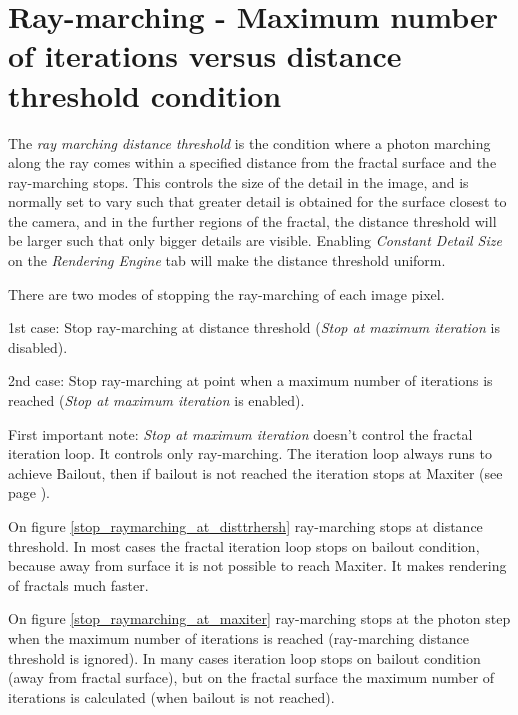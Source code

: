 \section{Ray-marching - Maximum number of iterations versus distance threshold
	condition}\label{ray-marching---maximum-number-of-iterations-versus-distance-threshold-condition}

The \emph{ray marching distance threshold} is the condition where a photon
marching along the ray comes within a specified distance from the fractal
surface and the ray-marching stops. This controls the size of the detail in the
image, and is normally set to vary such that greater detail is obtained for the
surface closest to the camera, and in the further regions of the fractal, the
distance threshold will be larger such that only bigger details are visible.
Enabling \emph{Constant Detail Size} on the \emph{Rendering Engine} tab will
make the distance threshold uniform.

There are two modes of stopping the ray-marching of each image pixel.

1st case: Stop ray-marching at distance threshold (\emph{Stop at maximum
	iteration} is disabled).

2nd case: Stop ray-marching at point when a maximum number of iterations is
reached (\emph{Stop at maximum iteration} is enabled).

First important note: \emph{Stop at maximum iteration} doesn't control the
fractal iteration loop. It controls only ray-marching. The iteration loop always
runs to achieve Bailout, then if bailout is not reached the iteration stops at
Maxiter (see page \pageref{bailout-maxiter}).

On figure \ref{stop_raymarching_at_disttrhersh} ray-marching stops at distance threshold. In most cases the fractal iteration
loop stops on bailout condition, because away from surface it is not possible
to reach Maxiter. It makes rendering of fractals much faster.

On figure \ref{stop_raymarching_at_maxiter} ray-marching stops at the photon step when the maximum number of iterations is
reached (ray-marching distance threshold is ignored). In many cases iteration
loop stops on bailout condition (away from fractal surface), but on the fractal
surface the maximum number of iterations is calculated (when bailout is not
reached).

